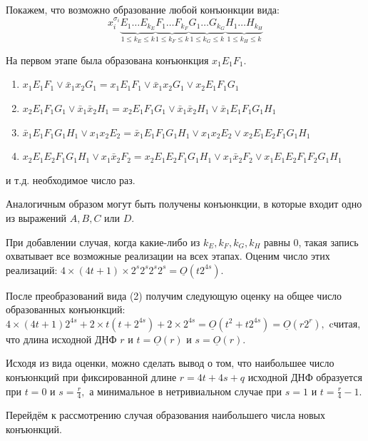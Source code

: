 \documentclass[12pt,a4paper,oneside,fleqn,leqno]{article}
\theoremstyle{definition}
\begin{document}
			Покажем, что возможно образование любой конъюнкции вида:
			$$
			x_i^{\sigma_i} \underbrace{E_1\ldots E_{k_E}}_{1\leqslant k_E \leqslant k}\underbrace{F_1\ldots F_{k_F}}_{1\leqslant k_F \leqslant k}\underbrace{G_1\ldots G_{k_G}}_{1\leqslant k_G \leqslant k}\underbrace{H_1\ldots H_{k_H}}_{1\leqslant k_H \leqslant k}$$\par
			На первом этапе была образована конъюнкция $x_1E_1F_1.$
			\begin{enumerate}\itemsep=0pt
				\item
				$x_1E_1F_1 \vee \bar{x}_1x_2G_1 = x_1E_1F_1 \vee \bar{x}_1x_2G_1 \vee x_2E_1F_1G_1$
				\item
				$x_2E_1F_1G_1 \vee \bar{x}_1\bar{x}_2H_1 = x_2E_1F_1G_1 \vee \bar{x}_1\bar{x}_2H_1 \vee \bar{x}_1E_1F_1G_1H_1$
				\item
				$\bar{x}_1E_1F_1G_1H_1 \vee x_1x_2E_2 = \bar{x}_1E_1F_1G_1H_1 \vee x_1x_2E_2 \vee x_2E_1E_2F_1G_1H_1$
				\item
				$x_2E_1E_2F_1G_1H_1 \vee x_1\bar{x}_2F_2 = x_2E_1E_2F_1G_1H_1 \vee x_1\bar{x}_2F_2 \vee x_1E_1E_2F_1F_2G_1H_1$
			\end{enumerate}
			и т.д. необходимое число раз.\par
			Аналогичным образом могут быть получены конъюнкции, в которые входит одно из выражений $A, B, C$ или $D.$\par
			При добавлении случая, когда какие-либо из $k_E, k_F, k_G, k_H$ равны 0, такая запись охватывает все возможные реализации на всех этапах. Оценим число этих реализаций: $4 \times (4t + 1) \times 2^s2^s2^s2^s = \underline{O}(t2^{4s}).$\par
			После преобразований вида (2) получим следующую оценку на общее число образованных конъюнкций: $4\times (4t + 1)2^{4s} + 2\times t(t + 2^{4s}) + 2\times 2^{4s} = \underline{O}(t^2 + t2^{4s}) = \underline{O}(r2^r),$ cчитая, что длина исходной ДНФ $r$ и $t = \underline{O}(r)$ и $s = \underline{O}(r).$ \par
			Исходя из вида оценки, можно сделать вывод о том, что наибольшее число конъюнкций при фиксированной длине $r = 4t + 4s + q$ исходной ДНФ образуется при $t = 0$ и $s = \frac{r}{4},$ а минимальное в нетривиальном случае при $s = 1$ и $t = \frac{r}{4} - 1.$\par
			Перейдём к рассмотрению случая образования наибольшего числа новых конъюнкций.\par
\end{document}

